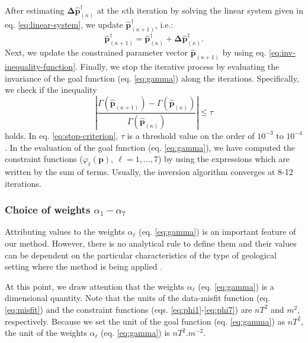 After estimating $\boldsymbol{\Delta} \hat{\mathbf{p}}^{\dagger}_{(\kappa)}$ at the 
$\kappa$th iteration by solving the linear system given in eq. \ref{eq:linear-system}, we update $\hat{\mathbf{p}}^{\dagger}_{(\kappa + 1)}$, i.e.:
\begin{equation}\label{eq:p-k1-dagger}
\hat{\mathbf{p}}^{\dagger}_{(\kappa + 1)} =
\hat{\mathbf{p}}^{\dagger}_{(\kappa)} +
\boldsymbol{\Delta} \hat{\mathbf{p}}^{\dagger}_{(\kappa)}.
\end{equation}
Next, we update the constrained parameter vector $\hat{\mathbf{p}}_{(\kappa + 1)}$ 
by using eq. \ref{eq:inv-inequality-function}.
Finally, we stop the iterative process by evaluating the invariance of the 
goal function (eq. \ref{eq:gamma}) along the iterations.
Specifically, we check if the inequality
\begin{equation}\label{eq:stop-criterion}
 \left| \frac{\Gamma (\hat{\mathbf{p}}_{(\kappa +1)}) - 
 \Gamma (\hat{\mathbf{p}}_{(\kappa)})}
 {\Gamma (\hat{\mathbf{p}}_{(\kappa)})} 
 \right| \le \tau
\end{equation}
holds. 
In eq. \ref{eq:stop-criterion}, $\tau$ is a threshold value on the order of $10^{-3}$
to $10^{-4}$. 
In the evaluation of the goal function (eq. \ref{eq:gamma}), we have computed the constraint functions 
($\varphi_{\ell}(\mathbf{p}), \: \ell = 1, \dots, 7$) by using the expressions which are written 
by the sum of terms. 
Usually, the inversion algorithm converges at 8-12 iterations. 

\subsubsection{Choice of weights $\alpha_{1}-\alpha_{7}$}

Attributing values to the weights $ \alpha_{\ell} $ (eq. \ref{eq:gamma}) is an important feature of our method. 
However, there is no analytical rule to define them and their values can be dependent on the particular characteristics of the type of geological setting where the method is being applied \cite[]{silva-2001}. 

At this point, we draw attention that the weights $ \alpha_{\ell}$ (eq. \ref{eq:gamma}) is a dimensional 
quantity. 
Note that the units of the data-misfit function (eq. \ref{eq:misfit}) and the constraint functions 
(eqs. \ref{eq:phi1}-\ref{eq:phi7}) are $nT^{2}$ and $m^{2}$, respectively.
Because we set the unit of the goal function (eq. \ref{eq:gamma}) as $nT^{2}$, the unit of the weights 
$ \alpha_{\ell} $ (eq. \ref{eq:gamma}) is $nT^{2}.m^{-2}$.

